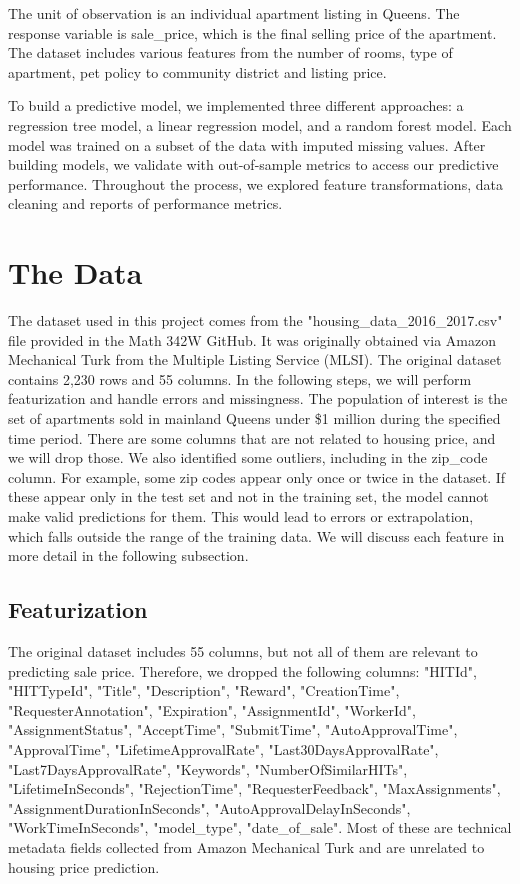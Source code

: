 \documentclass[12pt]{article}
\begin{document}
The unit of observation is an individual apartment listing in Queens. The response variable is sale\_price, which is the final selling price of the apartment. The dataset includes various features from the number of rooms, type of apartment, pet policy to community district and listing price.

To build a predictive model, we implemented three different approaches: a regression tree model, a linear regression model, and a random forest model. Each model was trained on a subset of the data with imputed missing values. After building models, we validate with out-of-sample metrics to access our predictive performance. Throughout the process, we explored feature transformations, data cleaning and reports of performance metrics. 


\section {The Data}

The dataset used in this project comes from the "housing\_data\_2016\_2017.csv" file provided in the Math 342W GitHub. It was originally obtained via Amazon Mechanical Turk from the Multiple Listing Service (MLSI). The original dataset contains 2,230 rows and 55 columns. In the following steps, we will perform featurization and handle errors and missingness. The population of interest is the set of apartments sold in mainland Queens under \$1 million during the specified time period. There are some columns that are not related to housing price, and we will drop those. We also identified some outliers, including in the zip\_code column. For example, some zip codes appear only once or twice in the dataset. If these appear only in the test set and not in the training set, the model cannot make valid predictions for them. This would lead to errors or extrapolation, which falls outside the range of the training data. We will discuss each feature in more detail in the following subsection.

\subsection{Featurization}

The original dataset includes 55 columns, but not all of them are relevant to predicting sale price. Therefore, we dropped the following columns: "HITId", "HITTypeId", "Title", "Description", "Reward", "CreationTime", "RequesterAnnotation", "Expiration", "AssignmentId", "WorkerId", "AssignmentStatus", "AcceptTime", "SubmitTime", "AutoApprovalTime", "ApprovalTime", "LifetimeApprovalRate", "Last30DaysApprovalRate", "Last7DaysApprovalRate", "Keywords", "NumberOfSimilarHITs", "LifetimeInSeconds", "RejectionTime", "RequesterFeedback", "MaxAssignments", "AssignmentDurationInSeconds", "AutoApprovalDelayInSeconds", "WorkTimeInSeconds", "model\_type", "date\_of\_sale". Most of these are technical metadata fields collected from Amazon Mechanical Turk and are unrelated to housing price prediction.
\end{document}
